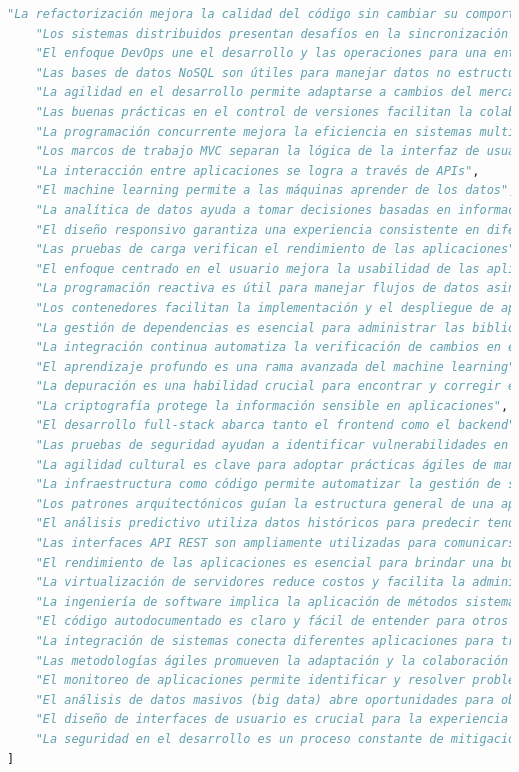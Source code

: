 \documentclass[journal, spanish]{IEEEtran}
\begin{document}
\begin{lstlisting}[language=Python]
    "La refactorización mejora la calidad del código sin cambiar su comportamiento",
    "Los sistemas distribuidos presentan desafíos en la sincronización de datos",
    "El enfoque DevOps une el desarrollo y las operaciones para una entrega eficiente",
    "Las bases de datos NoSQL son útiles para manejar datos no estructurados",
    "La agilidad en el desarrollo permite adaptarse a cambios del mercado",
    "Las buenas prácticas en el control de versiones facilitan la colaboración",
    "La programación concurrente mejora la eficiencia en sistemas multiusuario",
    "Los marcos de trabajo MVC separan la lógica de la interfaz de usuario",
    "La interacción entre aplicaciones se logra a través de APIs",
    "El machine learning permite a las máquinas aprender de los datos",
    "La analítica de datos ayuda a tomar decisiones basadas en información",
    "El diseño responsivo garantiza una experiencia consistente en diferentes dispositivos",
    "Las pruebas de carga verifican el rendimiento de las aplicaciones",
    "El enfoque centrado en el usuario mejora la usabilidad de las aplicaciones",
    "La programación reactiva es útil para manejar flujos de datos asincrónicos",
    "Los contenedores facilitan la implementación y el despliegue de aplicaciones",
    "La gestión de dependencias es esencial para administrar las bibliotecas externas",
    "La integración continua automatiza la verificación de cambios en el código",
    "El aprendizaje profundo es una rama avanzada del machine learning",
    "La depuración es una habilidad crucial para encontrar y corregir errores",
    "La criptografía protege la información sensible en aplicaciones",
    "El desarrollo full-stack abarca tanto el frontend como el backend",
    "Las pruebas de seguridad ayudan a identificar vulnerabilidades en el software",
    "La agilidad cultural es clave para adoptar prácticas ágiles de manera efectiva",
    "La infraestructura como código permite automatizar la gestión de servidores",
    "Los patrones arquitectónicos guían la estructura general de una aplicación",
    "El análisis predictivo utiliza datos históricos para predecir tendencias",
    "Las interfaces API REST son ampliamente utilizadas para comunicarse con aplicaciones",
    "El rendimiento de las aplicaciones es esencial para brindar una buena experiencia",
    "La virtualización de servidores reduce costos y facilita la administración",
    "La ingeniería de software implica la aplicación de métodos sistemáticos",
    "El código autodocumentado es claro y fácil de entender para otros programadores",
    "La integración de sistemas conecta diferentes aplicaciones para trabajar juntas",
    "Las metodologías ágiles promueven la adaptación y la colaboración continua",
    "El monitoreo de aplicaciones permite identificar y resolver problemas en tiempo real",
    "El análisis de datos masivos (big data) abre oportunidades para obtener insights",
    "El diseño de interfaces de usuario es crucial para la experiencia del usuario",
    "La seguridad en el desarrollo es un proceso constante de mitigación de riesgos"
]


\end{lstlisting}
\end{document}
